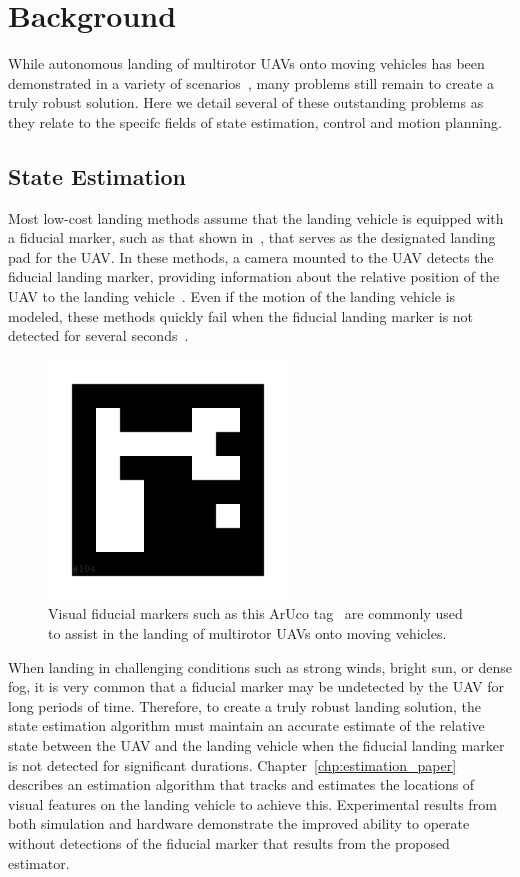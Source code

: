 \section{Background}

While autonomous landing of multirotor UAVs onto moving vehicles has been
demonstrated in a variety of scenarios~\cite{wynn2019visual}, many problems still remain to
create a truly robust solution. Here we detail several of these outstanding
problems as they relate to the specifc fields of state estimation, control and
motion planning.

\subsection{State Estimation}
Most low-cost landing methods assume that the landing vehicle is equipped with a
fiducial marker, such as that shown in~, that serves as
the designated landing pad for the UAV.
In these methods, a camera mounted to the UAV detects the fiducial landing marker, providing
information about the relative position of the UAV to the landing
vehicle~\cite{borowczyk2017autonomous}. Even if the motion of the landing vehicle is
modeled, these methods quickly fail when the fiducial landing
marker is not detected for several seconds~\cite{ling2014precision}.

\begin{figure}[h]
  \centering
  \includegraphics[width=2.5in]{figures/aruco_104.png}
  \caption[Visual Fiducial Landing Marker]{Visual fiducial markers such as this
    ArUco tag~\cite{garrido2016generation} are commonly used to assist in the
  landing of multirotor UAVs onto moving vehicles.}
  \label{fig:aruco_tag}
\end{figure}

When landing in challenging conditions such as strong winds, bright sun, or
dense fog, it is very common that a fiducial marker may be undetected by the UAV
for long periods of time. Therefore, to create a truly robust landing solution,
the state estimation algorithm must maintain an accurate estimate of the relative
state between the UAV and the landing vehicle when the fiducial landing marker
is not detected for significant durations. Chapter~\ref{chp:estimation_paper}
describes an estimation algorithm that tracks and estimates the locations of
visual features on the landing vehicle to achieve this. Experimental results
from both simulation and hardware demonstrate the improved ability to operate
without detections of the fiducial marker that results from the proposed
estimator.

